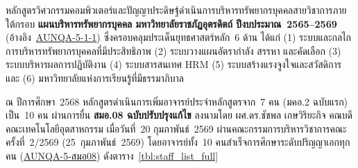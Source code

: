 


หลักสูตรวิศวกรรมคอมพิวเตอร์และปัญญาประดิษฐ์ดำเนินการบริหารทรัพยากรบุคคลสายวิชาการภายใต้กรอบ \textbf{แผนบริหารทรัพยากรบุคคล มหาวิทยาลัยราชภัฏอุตรดิตถ์ ปีงบประมาณ~2565--2569} (อ้างอิง~\hyperlink{ref:AUNQA-5-1-1}{AUNQA-5-1-1}) ซึ่งครอบคลุมประเด็นยุทธศาสตร์หลัก~6 ด้าน ได้แก่ (1) ระบบและกลไกการบริหารทรัพยากรบุคคลที่มีประสิทธิภาพ (2) ระบบวางแผนอัตรากำลัง สรรหา และคัดเลือก (3) ระบบบริหารผลการปฏิบัติงาน (4) ระบบสารสนเทศ HRM (5) ระบบสร้างแรงจูงใจและสวัสดิการ และ (6) มหาวิทยาลัยแห่งการเรียนรู้ที่มีธรรมาภิบาล


ณ ปีการศึกษา~2568 หลักสูตรดำเนินการเพิ่มอาจารย์ประจำหลักสูตรจาก~7 คน (มคอ.2 ฉบับแรก) เป็น~10 คน ผ่านการยื่น \textbf{สมอ.08 ฉบับปรับปรุงแก้ไข} ลงนามโดย ผศ.ดร.ชัชพล เกษวิริยะกิจ คณบดีคณะเทคโนโลยีอุตสาหกรรม เมื่อวันที่~20 กุมภาพันธ์~2569 ผ่านคณะกรรมการบริหารวิชาการคณะ ครั้งที่~2/2569 (25~กุมภาพันธ์~2569) โดยอาจารย์ทั้ง~10 คนสำเร็จการศึกษาระดับปริญญาเอกทุกคน (\hyperlink{ref:AUNQA-5-สมอ08}{AUNQA-5-สมอ08}) ดังตาราง~\ref{tbl:staff_list_full}

